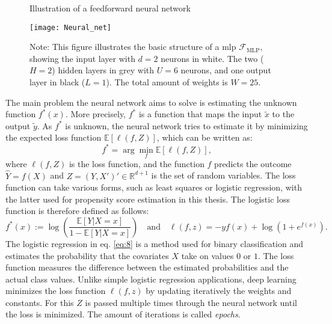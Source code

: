 \begin{figure}%
\centering
\caption{Illustration of a feedforward neural network \citep{farrellDeepNeuralNetworks2021}}
\texttt{[image: Neural\_net]}
\caption*{Note: This figure illustrates the basic structure of a \ac{mlp} $\mathcal{F}_{\text{MLP}}$, showing the input layer with $d=2$ neurons in white. The two ($H=2$) hidden layers in grey with $U=6$ neurons, and one output layer in black ($L=1$). The total amount of weights is $W=25$.}
\label{fig:1}
\end{figure}


The main problem the neural network aims to solve is estimating the unknown function $f^*(x)$.
More precisely, $f^*$ is a function that maps the input $\tilde{x}$ to the output $\tilde{y}$.
As $f^*$ is unknown, the neural network tries to estimate it by minimizing the expected loss function $\mathbb{E}[\ell(f, Z)]$, which can be written as:
\begin{equation}
f^* = \arg \min_f \mathbb{E}[\ell(f, Z)],
\end{equation}
where $\ell(f, Z)$ is the loss function, and the function $f$ predicts the outcome $\hat{Y} = f(X)$ and $Z = (Y, X')' \in \mathbb{R}^{d+1}$ is the set of random variables.
The loss function can take various forms, such as least squares or logistic regression, with the latter used for propensity score estimation in this thesis.
The logistic loss function is therefore defined as follows:
\begin{equation}
f^*(x) := \log \left( \frac{\mathbb{E}[Y|X = x]}{1 - \mathbb{E}[Y|X = x]} \right) \quad \text{and} \quad \ell(f, z) = -yf(x) + \log(1 + e^{f(x)}).
\label{eq:8}
\end{equation}
The logistic regression in eq. \ref*{eq:8} is a method used for binary classification and estimates the probability that the covariates $X$ take on values $0$ or $1$.
The loss function measures the difference between the estimated probabilities and the actual class values.
Unlike simple logistic regression applications, deep learning minimizes the loss function $\ell(f, z)$ by updating iteratively the weights and constants.
For this $Z$ is passed multiple times through the neural network until the loss is minimized.
The amount of iterations is called \textit{epochs}.

